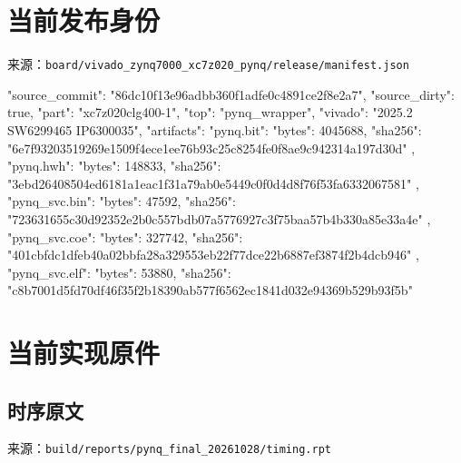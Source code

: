 \Needspace{85pt}

\section{当前发布身份}

来源：\texttt{board/\allowbreak{}vivado\_\allowbreak{}zynq7000\_\allowbreak{}xc7z020\_\allowbreak{}pynq/\allowbreak{}release/\allowbreak{}manifest.\allowbreak{}json}

\begin{codeblock}
{
  "source_commit": "86dc10f13e96adbb360f1adfe0c4891ce2f8e2a7",
  "source_dirty": true,
  "part": "xc7z020clg400-1",
  "top": "pynq_wrapper",
  "vivado": "2025.2 SW6299465 IP6300035",
  "artifacts": {
    "pynq.bit": {
      "bytes": 4045688,
      "sha256": "6e7f93203519269e1509f4ece1ee76b93c25c8254fe0f8ae9c942314a197d30d"
    },
    "pynq.hwh": {
      "bytes": 148833,
      "sha256": "3ebd26408504ed6181a1eac1f31a79ab0e5449c0f0d4d8f76f53fa6332067581"
    },
    "pynq_svc.bin": {
      "bytes": 47592,
      "sha256": "723631655c30d92352e2b0c557bdb07a5776927c3f75baa57b4b330a85e33a4e"
    },
    "pynq_svc.coe": {
      "bytes": 327742,
      "sha256": "401cbfdc1dfeb40a02bbfa28a329553eb22f77dce22b6887ef3874f2b4dcb946"
    },
    "pynq_svc.elf": {
      "bytes": 53880,
      "sha256": "c8b7001d5fd70df46f35f2b18390ab577f6562ec1841d032e94369b529b93f5b"
    }
  }
}
\end{codeblock}

\Needspace{85pt}

\section{当前实现原件}

\Needspace{85pt}

\subsection{时序原文}

来源：\texttt{build/\allowbreak{}reports/\allowbreak{}pynq\_\allowbreak{}final\_\allowbreak{}20261028/\allowbreak{}timing.\allowbreak{}rpt}

